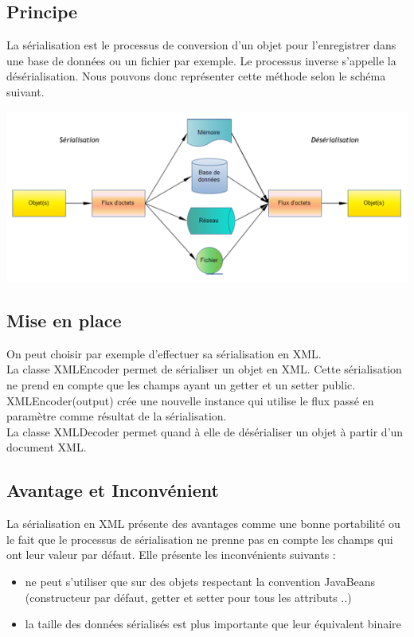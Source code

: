 \subsection{Principe}

La sérialisation est le processus de conversion d'un objet pour l'enregistrer dans une base de données ou un fichier par exemple. Le processus inverse s'appelle la désérialisation. Nous pouvons donc représenter cette méthode selon le schéma suivant. 

\begin{center}
\includegraphics[scale=0.5]{../graph/serialisation.png} \\
\end{center}

\subsection{Mise en place}
On peut choisir par exemple d'effectuer sa sérialisation en XML. \\

La classe XMLEncoder permet de sérialiser un objet en XML. Cette sérialisation ne prend en compte que les champs ayant un getter et un setter public. XMLEncoder(output) crée une nouvelle instance qui utilise le flux passé en paramètre comme résultat de la sérialisation. \\

La classe XMLDecoder permet quand à elle de désérialiser un objet à partir d'un document XML. \\




\subsection{Avantage et Inconvénient}
La sérialisation en XML présente des avantages comme une bonne portabilité ou le fait que le processus de sérialisation ne prenne pas en compte les champs qui ont leur valeur par défaut. Elle présente les inconvénients suivants : 
\begin{itemize}
\item ne peut s'utiliser que sur des objets respectant la convention JavaBeans (constructeur par défaut, getter et setter pour tous les attributs ..)
\item la taille des données sérialisés est plus importante que leur équivalent binaire
\end{itemize}